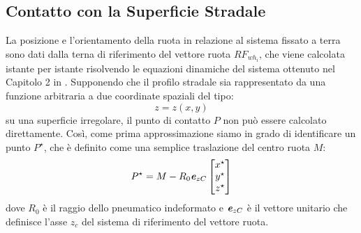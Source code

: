 \subsection{Contatto con la Superficie Stradale}
La posizione e l'orientamento della ruota in relazione al sistema fissato a terra sono dati dalla terna di riferimento del vettore ruota $RF_{wh_{i}}$, che viene calcolata istante per istante risolvendo le equazioni dinamiche del sistema ottenuto nel Capitolo 2 in \cite{Larcher}. Supponendo che il profilo stradale sia rappresentato da una funzione arbitraria a due coordinate spaziali del tipo: 
%
\begin{equation}
z=z(x,y)
\end{equation}
%
su una superficie irregolare, il punto di contatto $P$ non può essere calcolato direttamente. Così, come prima approssimazione siamo in grado di identificare un punto $P^\star$, che è definito come una semplice traslazione del centro ruota $M$:
%
\begin{equation}
P^\star = M-R_0\textbf{\textit{e}}_{zC}
\begin{bmatrix}
x^\star\\
y^\star\\
z^\star
\end{bmatrix}
\end{equation}
%
dove $R_0$ è il raggio dello pneumatico indeformato e $\textbf{\textit{e}}_{zC}$ è il vettore unitario che definisce l'asse $z_c$ del sistema di riferimento del vettore ruota.

